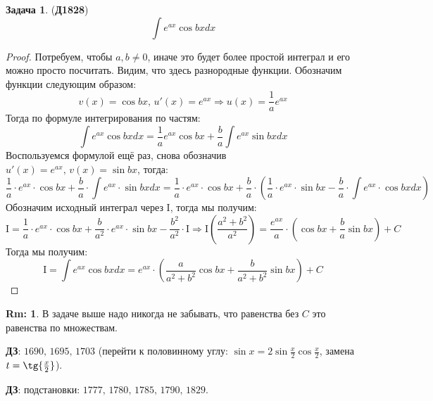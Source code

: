 \documentclass[12pt]{article}
\newcommand{\MI}{\mathrm{I}}
\theoremstyle{definition}
\newtheorem{rem}{Rm:}
\newtheorem{problem}{Задача}
\DeclareMathOperator{\dint}{\displaystyle\int}
\begin{document}
\begin{problem}(\textbf{Д1828})
	$$
		\dint e^{ax} \cos{bx}dx
	$$
\end{problem}
\begin{proof}
	Потребуем, чтобы $a, b \neq 0$, иначе это будет  более простой интеграл и его можно просто посчитать. Видим, что здесь разнородные функции. Обозначим функции следующим образом:
	$$
		v(x) = \cos{bx}, \, u'(x) = e^{ax} \Rightarrow u(x) = \dfrac{1}{a}e^{ax}
	$$
	Тогда по формуле интегрирования по частям:
	$$
		\dint e^{ax} \cos{bx}dx = \dfrac{1}{a}e^{ax}\cos{bx} + \dfrac{b}{a}\dint e^{ax} \sin{bx}dx
	$$
	Воспользуемся формулой ещё раз, снова обозначив $u'(x) = e^{ax}, \, v(x) = \sin{bx}$, тогда:
	$$
		\dfrac{1}{a}{\cdot}e^{ax}{\cdot}\cos{bx} + \dfrac{b}{a}{\cdot}\dint e^{ax}{\cdot} \sin{bx}dx = \dfrac{1}{a}{\cdot}e^{ax}{\cdot}\cos{bx} + \dfrac{b}{a}{\cdot}\left(\dfrac{1}{a}{\cdot}e^{ax}{\cdot}\sin{bx} - \dfrac{b}{a}{\cdot}\dint e^{ax}{\cdot}\cos{bx}dx\right)
	$$
	Обозначим исходный интеграл через $\MI$, тогда мы получим:
	$$
		\MI = \dfrac{1}{a}{\cdot}e^{ax}{\cdot}\cos{bx} + \dfrac{b}{a^2}{\cdot}e^{ax}{\cdot}\sin{bx} - \dfrac{b^2}{a^2}{\cdot}\MI \Rightarrow \MI \left(\dfrac{a^2 + b^2}{a^2}\right) = \dfrac{e^{ax}}{a}{\cdot}\left(\cos{bx} + \dfrac{b}{a} \sin{bx}\right) + C
	$$
	Тогда мы получим:
	$$
		\MI = \dint e^{ax} \cos{bx}dx = e^{ax}{\cdot}\left(\dfrac{a}{a^2 + b^2}\cos{bx} + \dfrac{b}{a^2 + b^2}\sin{bx}\right) + C
	$$
\end{proof}
\begin{rem}
	В задаче выше надо никогда не забывать, что равенства без $C$ это равенства по множествам. 
\end{rem}

\textbf{ДЗ}: $1690, \, 1695, \, 1703$ (перейти к половинному углу: $\sin{x} = 2\sin{\frac{x}{2}}\cos{\frac{x}{2}}$, замена $t= \tg{\frac{x}{2}}$). 

\textbf{ДЗ}: подстановки: $1777, \, 1780, \, 1785, \, 1790, \, 1829$.
\end{document}
